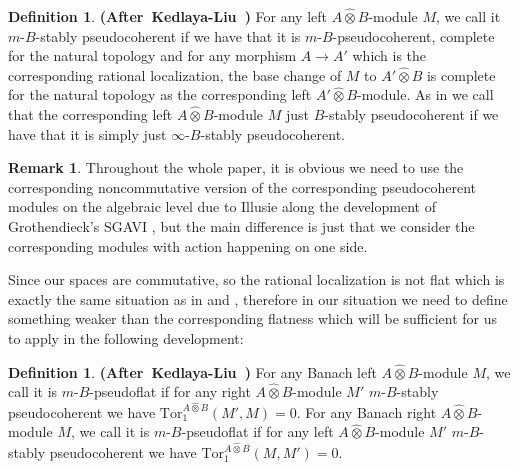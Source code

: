 \documentclass[12pt]{amsart}
\theoremstyle{definition}
\newtheorem{definition}[theorem]{Definition}
\newtheorem{remark}[theorem]{Remark}
\numberwithin{equation}{section}
\begin{document}
\begin{definition} \mbox{\bf{(After Kedlaya-Liu \cite[Definition 2.4.1]{KL2})}}
For any left $A\widehat{\otimes}B$-module $M$, we call it $m$-$B$-stably pseudocoherent if we have that it is $m$-$B$-pseudocoherent, complete for the natural topology and for any morphism $A\rightarrow A'$ which is the corresponding rational localization, the base change of $M$ to $A'\widehat{\otimes} B$ is complete for the natural topology as the corresponding left $A'\widehat{\otimes} B$-module.	As in \cite[Definition 2.4.1]{KL2} we call that the corresponding left $A\widehat{\otimes}B$-module $M$ just $B$-stably pseudocoherent if we have that it is simply just $\infty$-$B$-stably pseudocoherent.
\end{definition}



\begin{remark}
Throughout the whole paper, it is obvious we need to use the corresponding noncommutative version of the corresponding pseudocoherent modules on the algebraic level due to Illusie along the development of Grothendieck's SGAVI \cite{SGAVI}, but the main difference is just that we consider the corresponding modules with action happening on one side.
\end{remark}





\indent Since our spaces are commutative, so the rational localization is not flat which is exactly the same situation as in \cite{KL1} and \cite{KL2}, therefore in our situation we need to define something weaker than the corresponding flatness which will be sufficient for us to apply in the following development: 

\begin{definition}\mbox{\bf{(After Kedlaya-Liu \cite[Definition 2.4.4]{KL2})}}
For any Banach left $A\widehat{\otimes}B$-module $M$, we call it is $m$-$B$-pseudoflat if for any right $A\widehat{\otimes}B$-module $M'$ $m$-$B$-stably pseudocoherent we have $\mathrm{Tor}_1^{A\widehat{\otimes}B}(M',M)=0$. For any Banach right $A\widehat{\otimes}B$-module $M$, we call it is $m$-$B$-pseudoflat if for any left $A\widehat{\otimes}B$-module $M'$ $m$-$B$-stably pseudocoherent we have $\mathrm{Tor}_1^{A\widehat{\otimes}B}(M,M')=0$.
\end{definition}
\end{document}
